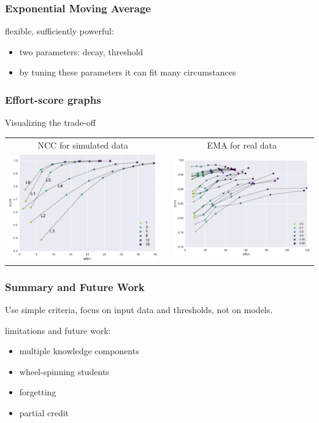 \documentclass[bigger]{beamer}
\begin{document}

\begin{frame}
  \frametitle{Exponential Moving Average}


  flexible, sufficiently powerful:
  \begin{itemize}
  \item two parameters: decay, threshold
  \item by tuning these parameters it can fit many circumstances
  \end{itemize}
\end{frame}

\begin{frame}
  \frametitle{Effort-score graphs}
  
  \begin{center}
    Visualizing the trade-off

    \bigskip

    \begin{tabular}{ccc}    
      NCC for simulated data & & EMA for real data \\
      \includegraphics[width=.45\linewidth]{ncc-effort-score} & &
      \includegraphics[width=.45\linewidth]{uc-effort-score}
    \end{tabular}
  \end{center}
\end{frame}

\begin{frame}
  \frametitle{Summary and Future Work}

  \begin{block}{}
    Use simple criteria, focus on input data and thresholds, not on models.
  \end{block}

  \medskip

  limitations and future work:
  \begin{itemize}
  \item multiple knowledge components
  \item wheel-spinning students
  \item forgetting
  \item partial credit
  \end{itemize}
\end{frame}
\end{document}
